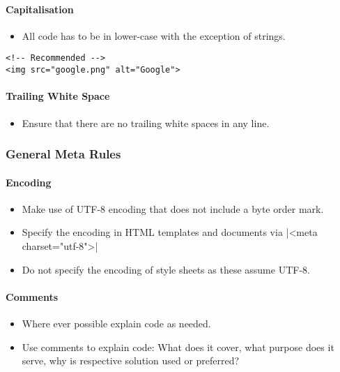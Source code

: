 \documentclass[a4paper, 11pt]{article}
\begin{document}
\paragraph{Capitalisation}
\begin{itemize}
\item All code has to be in lower-case with the exception of strings.
\end{itemize}
\begin{verbatim}
<!-- Recommended -->
<img src="google.png" alt="Google">
\end{verbatim}

\paragraph{Trailing White Space}
\begin{itemize}
\item Ensure that there are no trailing white spaces in any line.
\end{itemize}

\pagebreak

\subsubsection{General Meta Rules}

\paragraph{Encoding}
\begin{itemize}
\item Make use of UTF-8 encoding that does not include a byte order mark.
\item Specify the encoding in HTML templates and documents via |<meta charset="utf-8">|
\item Do not specify the encoding of style sheets as these assume UTF-8.
\end{itemize}

\paragraph{Comments}
\begin{itemize}
\item Where ever possible explain code as needed.
\item Use comments to explain code: What does it cover, what purpose does it serve, why is respective solution used or preferred?
\end{itemize}
\end{document}
